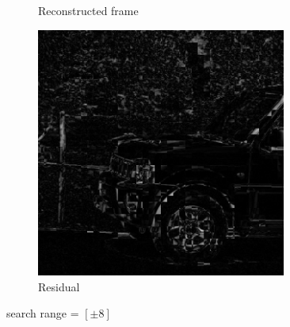 \documentclass{homework}
\begin{document}
\begin{figure}[H]
\begin{subfigure}{0.32\textwidth}
        \caption{Reconstructed frame}
    \end{subfigure}
    \begin{subfigure}{0.32\textwidth}
        \centering
        \includegraphics[width=0.9\textwidth]{8_8_TSS_residual.png}
        \caption{Residual}
    \end{subfigure}
    \caption{search range = $[\pm 8]$}
\end{figure}
\end{document}
